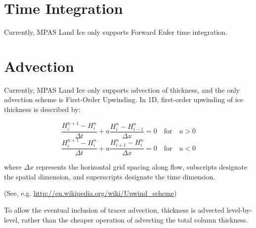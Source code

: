 \section{Time Integration}

Currently, MPAS Land Ice only supports Forward Euler time integration.


\section{Advection}

Currently, MPAS Land Ice only supports advection of thickness, and the only advection scheme is First-Order Upwinding.  In 1D, first-order upwinding of ice thickness is described by:

\begin{equation}
    \label{fouw}
 \frac{H_i^{n+1} - H_i^n}{\Delta t} + u \frac{H_i^n - H_{i-1}^n}{\Delta x} = 0 \quad \text{for} \quad u > 0
\end{equation}
\begin{equation}
 \frac{H_i^{n+1} - H_i^n}{\Delta t} + u \frac{H_{i+1}^n - H_i^n}{\Delta x} = 0 \quad \text{for} \quad u < 0
\end{equation}

where ${\Delta x}$ represents the horizontal grid spacing along flow, subscripts designate the spatial dimension, and superscripts designate the time dimension.

(See, e.g. \url{http://en.wikipedia.org/wiki/Upwind\_scheme})

To allow the eventual inclusion of tracer advection, thickness is advected level-by-level, rather than the cheaper operation of advecting the total column thickness.


